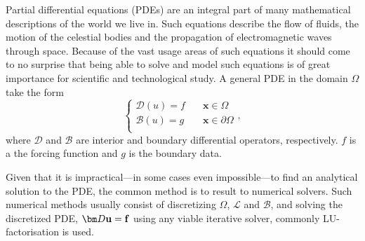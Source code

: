 Partial differential equations (PDEs) are an integral part of many mathematical descriptions of the world we live in.
Such equations describe the flow of fluids, the motion of the celestial bodies and the propagation of electromagnetic waves through space.
Because of the vast usage areas of such equations it should come to no surprise that being able to solve and model such equations is of great importance for scientific and technological study. 
A general PDE in the domain $\Omega$ take the form
\begin{equation}
    \left\{
    \begin{aligned}
        \mathcal{D}(u) = f &\quad \mathbf{x}\in \Omega\\
        \mathcal{B}(u) = g &\quad \mathbf{x}\in \partial\Omega\\
    \end{aligned}
    \right. ,
    \label{eq: general PDE}
\end{equation}
where $\mathcal{D}$ and $\mathcal{B}$ are interior and boundary differential operators, respectively. $f$ is a the forcing function and $g$ is the boundary data. 

Given that it is impractical---in some cases even impossible---to find an analytical solution to the PDE, 
the common method is to result to numerical solvers. Such numerical methods usually consist of discretizing $\Omega$, $\mathcal L$ and $\mathcal B$, and solving the discretized PDE, $\mat D \vect u = \vect f$ using any viable iterative solver, commonly LU-factorisation is used.

 